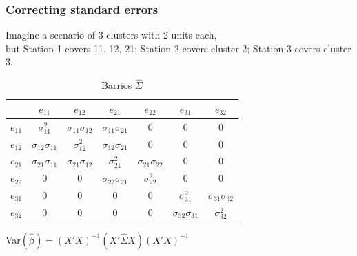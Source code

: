\documentclass{beamer}
\begin{document}
\begin{frame}
\frametitle{Correcting standard errors}
Imagine a scenario of 3 clusters with 2 units each, \\
but Station 1 covers 11, 12, 21; Station 2 covers cluster 2; Station 3 covers cluster 3.
\begin{table}[h]
\caption{Barrios $\hat{\Sigma}$}
\begin{tabular}{ c|c c c c c c|}
 		 &  $e_{11}$ 		& $e_{12}$ 		& $e_{21}$ & $e_{22}$ & $e_{31}$ & $e_{32}$\\ \hline
$e_{11}$ & $\sigma_{11}^2$ & $\sigma_{11}\sigma_{12}$ 	   & $\sigma_{11}\sigma_{21}$ 		  & 0 		 & 0 		& 0 		\\
$e_{12}$ & $\sigma_{12}\sigma_{11}$  	 & $\sigma_{12}^2$ & $\sigma_{12}\sigma_{21}$ 		  & 0 		 & 0 		& 0 		\\
$e_{21}$ & $\sigma_{21}\sigma_{11}$  	& $\sigma_{21}\sigma_{12}$ 	   & $\sigma_{21}^2$ & $\sigma_{21}\sigma_{22}$ 		 & 0 		& 0 		\\
$e_{22}$ & 0			 & 0 	   & $\sigma_{22}\sigma_{21}$& $\sigma_{22}^2$ & 0 		& 0 		\\
$e_{31}$ & 0			 & 0 	   & 0 		  & 0 		 & $\sigma_{31}^2$ & $\sigma_{31}\sigma_{32}$\\
$e_{32}$ & 0			 & 0 	   & 0 		  & 0 		 & $\sigma_{32}\sigma_{31}$& $\sigma_{32}^2$ \\ \hline
\end{tabular}
\end{table}
Var$(\hat{\beta})=(X'X)^{-1}(X' \hat{\Sigma} X)(X'X)^{-1}$\\
\end{frame}
\end{document}
